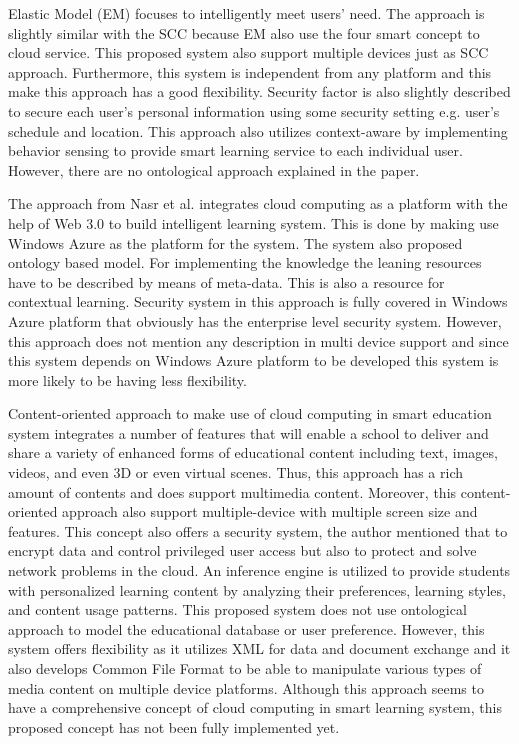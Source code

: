 \documentclass[journal]{vgtc}
\begin{document}
Elastic Model (EM) \cite{Kim2013} focuses to intelligently meet users' need. The approach is slightly similar with the SCC because EM also use the four smart concept to cloud service. This proposed system also support multiple devices just as SCC approach. Furthermore, this system is independent from any platform and this make this approach has a good flexibility. Security factor is also slightly described to secure each user's personal information using some security setting e.g. user's schedule and location. This approach also utilizes context-aware by implementing behavior sensing to provide smart learning service to each individual user. However, there are no ontological approach explained in the paper. 

The approach from Nasr et al. \cite{nasr2012proposed} integrates cloud computing as a platform with the help of Web 3.0 to build intelligent learning system. This is done by making use Windows Azure as the platform for the system. The system also proposed ontology based model. For implementing the knowledge the leaning resources have to be described by means of meta-data. This is also a resource for contextual learning. Security system in this approach is fully covered in Windows Azure platform that obviously has the enterprise level security system. However, this approach does not mention any description in multi device support and since this system depends on Windows Azure platform to be developed this system is more likely to be having less flexibility.

Content-oriented approach \cite{jeong2013content} to make use of cloud computing in smart education system integrates a number of features that will enable a school to deliver and share a variety of enhanced forms of educational content including text, images, videos, and even 3D or even virtual scenes. Thus, this approach has a rich amount of contents and does support multimedia content. Moreover, this content-oriented approach also support multiple-device with multiple screen size and features. This concept also offers a security system, the author mentioned that to encrypt data and control privileged user access but also to protect and solve network problems in the cloud. An inference engine is utilized to provide students with personalized learning content by analyzing their preferences, learning styles, and content usage patterns. This proposed system does not use ontological approach to model the educational database or user preference. However, this system offers flexibility as it utilizes XML for data and document exchange and it also develops Common File Format to be able to manipulate various types of media content on multiple device platforms. Although this approach seems to have a comprehensive concept of cloud computing in smart learning system, this proposed concept has not been fully implemented yet.
\end{document}
